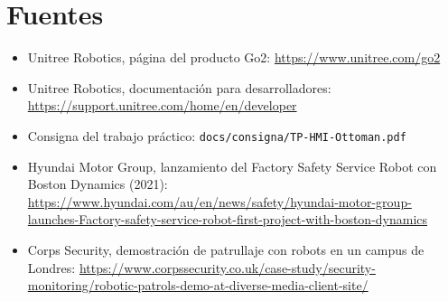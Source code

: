 \section{Fuentes}
\label{sec:fuentes}

\begin{itemize}
  \item Unitree Robotics, página del producto Go2: \url{https://www.unitree.com/go2}
  \item Unitree Robotics, documentación para desarrolladores: \url{https://support.unitree.com/home/en/developer}
  \item Consigna del trabajo práctico: \texttt{docs/consigna/TP-HMI-Ottoman.pdf}
  \item Hyundai Motor Group, lanzamiento del Factory Safety Service Robot con Boston Dynamics (2021): \url{https://www.hyundai.com/au/en/news/safety/hyundai-motor-group-launches-Factory-safety-service-robot-first-project-with-boston-dynamics}
  \item Corps Security, demostración de patrullaje con robots en un campus de Londres: \url{https://www.corpssecurity.co.uk/case-study/security-monitoring/robotic-patrols-demo-at-diverse-media-client-site/}
\end{itemize}
